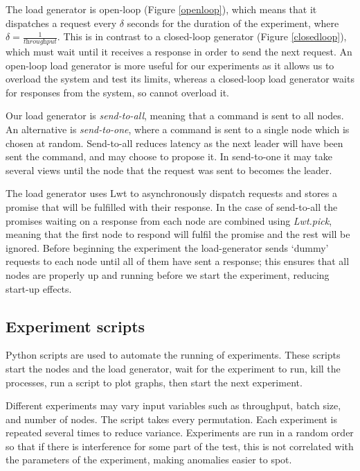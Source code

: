 The load generator is open-loop (Figure \ref{openloop}), which means that it dispatches a request every $\delta$ seconds for the duration of the experiment, where $\delta = \frac{1}{\textit{throughput}}$. This is in contrast to a closed-loop generator (Figure \ref{closedloop}), which must wait until it receives a response in order to send the next request. An open-loop load generator is more useful for our experiments as it allows us to overload the system and test its limits, whereas a closed-loop load generator waits for responses from the system, so cannot overload it.

Our load generator is \textit{send-to-all}, meaning that a command is sent to all nodes. An alternative is \textit{send-to-one}, where a command is sent to a single node which is chosen at random. Send-to-all reduces latency as the next leader will have been sent the command, and may choose to propose it. In send-to-one it may take several views until the node that the request was sent to becomes the leader.

The load generator uses Lwt to asynchronously dispatch requests and stores a promise that will be fulfilled with their response. In the case of send-to-all the promises waiting on a response from each node are combined using \textit{Lwt.pick}, meaning that the first node to respond will fulfil the promise and the rest will be ignored. Before beginning the experiment the load-generator sends `dummy' requests to each node until all of them have sent a response; this ensures that all nodes are properly up and running before we start the experiment, reducing start-up effects.

\subsection{Experiment scripts} \label{experimentscripts}
Python scripts are used to automate the running of experiments. These scripts start the nodes and the load generator, wait for the experiment to run, kill the processes, run a script to plot graphs, then start the next experiment.

Different experiments may vary input variables such as throughput, batch size, and number of nodes. The script takes every permutation. Each experiment is repeated several times to reduce variance. Experiments are run in a random order so that if there is interference for some part of the test, this is not correlated with the parameters of the experiment, making anomalies easier to spot.

